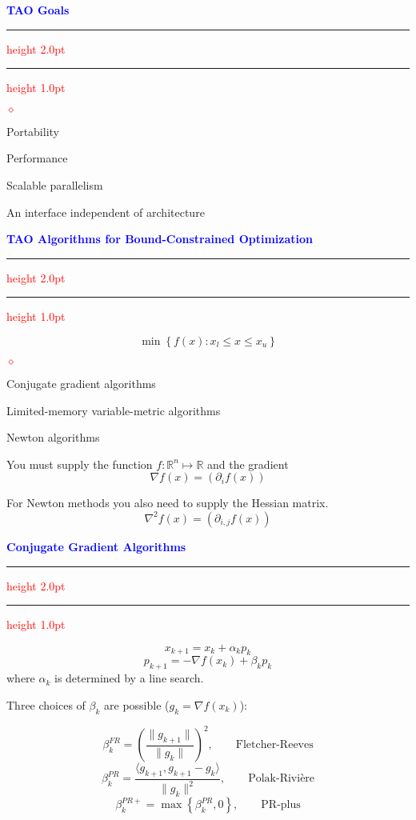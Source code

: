 \documentclass{seminar}
\newcommand{\R}{\mbox{${\mathbb R}$}}
\newcommand{\grad}{\nabla}
\newcommand{\reddiamond}{\textcolor{red}{$\diamond$}}
\newcommand{\redstripe}{\textcolor{red}{\hrule height 2.0pt\hfil}
             \vspace{-1.8pt}
             \textcolor{red}{\hrule height 1.0pt\hfil}
}
\newcommand{\heading}[1]{%
   \centerline{\textcolor{blue}{\textbf{#1}}}%
    \redstripe%
    \bigskip
}
\begin{document}
\begin{slide}

\heading{TAO Goals}

\begin{list}{\reddiamond}{}
\item
Portability
\item
Performance
\item
Scalable parallelism
\item
An interface independent of architecture
\end{list}

\vfill

\end{slide}


\begin{slide}

\heading{TAO Algorithms for Bound-Constrained Optimization}

\[
\min \left \{  f(x) : x_l \le x \le x_u \right \}
\]

\medskip

\begin{list}{\reddiamond}{}
\item
Conjugate gradient algorithms
\item
Limited-memory variable-metric algorithms
\item
Newton algorithms
\end{list}

You must supply the function $ f : \R^n \mapsto \R $ and the
gradient 
\[
\grad f (x) = \left ( \partial _i f(x) \right )
\]

For Newton methods you also need to supply the Hessian matrix.
\[
\grad^2 f (x) = \left ( \partial_{i,j} f(x) \right )
\]

\vfill

\end{slide}

\begin{slide}

\heading{Conjugate Gradient Algorithms}

\[
x_{k+1} = x_k + \alpha_k p_k 
\]
\[
p_{k+1} = - \grad f (x_k) + \beta_k p_k 
\]
where $ \alpha_k $ is determined by a line search.

\medskip

Three choices of $ \beta_k $ are possible ($ g_k = \grad f (x_k ) $):
 
\[
\beta_k^{FR} = \left (
\frac{\| g_{k+1} \|}{\| g_k \|}
\right ) ^ 2 , \qquad \mbox{Fletcher-Reeves}
\]
\[
\beta_k^{PR} = 
\frac{ \langle g_{k+1} , g_{k+1} - g_k \rangle }
{\| g_k \|^2},  \qquad \mbox{Polak-Rivi\`ere}
\]
\[
\beta_k^{PR+} = \max \left \{ \beta_k^{PR} , 0 \right \} , \qquad
\mbox{PR-plus}
\]

\vfill

\end{slide}
\end{document}
